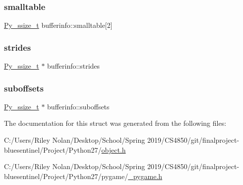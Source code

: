 \mbox{\label{structbufferinfo_a6356204d7bfc7a21dd86da6f7ab6268c}} 
\subsubsection{\texorpdfstring{smalltable}{smalltable}}
{\footnotesize\ttfamily \mbox{\hyperlink{pyport_8h_ac6411a3dfda9ac6feb9e8d859b1184bc}{Py\+\_\+ssize\+\_\+t}} bufferinfo\+::smalltable\mbox{[}2\mbox{]}}

\mbox{\label{structbufferinfo_a0fcbd0ae5672e27fac5c809ae8ed63df}} 
\subsubsection{\texorpdfstring{strides}{strides}}
{\footnotesize\ttfamily \mbox{\hyperlink{pyport_8h_ac6411a3dfda9ac6feb9e8d859b1184bc}{Py\+\_\+ssize\+\_\+t}} $\ast$ bufferinfo\+::strides}

\mbox{\label{structbufferinfo_a537cac447ea7c273dc1a7a847a954c21}} 
\subsubsection{\texorpdfstring{suboffsets}{suboffsets}}
{\footnotesize\ttfamily \mbox{\hyperlink{pyport_8h_ac6411a3dfda9ac6feb9e8d859b1184bc}{Py\+\_\+ssize\+\_\+t}} $\ast$ bufferinfo\+::suboffsets}



The documentation for this struct was generated from the following files\+:\begin{DoxyCompactItemize}
\item 
C\+:/\+Users/\+Riley Nolan/\+Desktop/\+School/\+Spring 2019/\+C\+S4850/git/finalproject-\/bluesentinel/\+Project/\+Python27/\mbox{\hyperlink{_python27_2object_8h}{object.\+h}}\item 
C\+:/\+Users/\+Riley Nolan/\+Desktop/\+School/\+Spring 2019/\+C\+S4850/git/finalproject-\/bluesentinel/\+Project/\+Python27/pygame/\mbox{\hyperlink{__pygame_8h}{\+\_\+pygame.\+h}}\end{DoxyCompactItemize}
